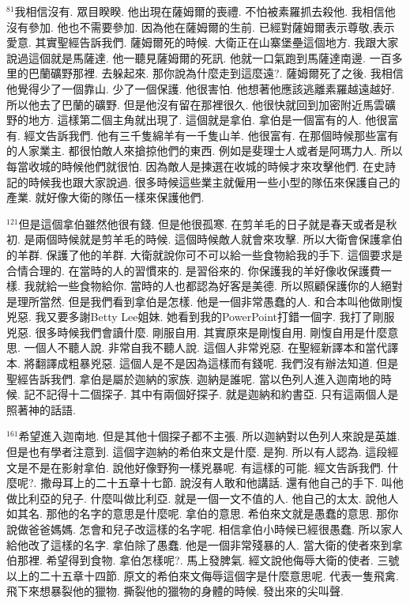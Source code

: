 \documentclass{book}
\begin{document}
$^{81}$我相信沒有.
眾目睽睽.
他出現在薩姆爾的喪禮.
不怕被素羅抓去殺他.
我相信他沒有參加.
他也不需要參加.
因為他在薩姆爾的生前.
已經對薩姆爾表示尊敬,表示愛意.
其實聖經告訴我們.
薩姆爾死的時候.
大衛正在山寨堡壘這個地方.
我跟大家說過這個就是馬薩達.
他一聽見薩姆爾的死訊.
他就一口氣跑到馬薩達南邊.
一百多里的巴蘭礦野那裡.
去躲起來.
那你說為什麼走到這麼遠?.
薩姆爾死了之後.
我相信他覺得少了一個靠山.
少了一個保護.
他很害怕.
他想著他應該逃離素羅越遠越好.
所以他去了巴蘭的礦野.
但是他沒有留在那裡很久.
他很快就回到加密附近馬雲礦野的地方.
這樣第二個主角就出現了.
這個就是拿伯.
拿伯是一個富有的人.
他很富有.
經文告訴我們.
他有三千隻綿羊有一千隻山羊.
他很富有.
在那個時候那些富有的人家業主.
都很怕敵人來搶掠他們的東西.
例如是斐理士人或者是阿瑪力人.
所以每當收城的時候他們就很怕.
因為敵人是揀選在收城的時候才來攻擊他們.
在史詩記的時候我也跟大家說過.
很多時候這些業主就僱用一些小型的隊伍來保護自己的產業.
就好像大衛的隊伍一樣來保護他們.

$^{121}$但是這個拿伯雖然他很有錢.
但是他很孤寒.
在剪羊毛的日子就是春天或者是秋初.
是兩個時候就是剪羊毛的時候.
這個時候敵人就會來攻擊.
所以大衛會保護拿伯的羊群.
保護了他的羊群.
大衛就說你可不可以給一些食物給我的手下.
這個要求是合情合理的.
在當時的人的習慣來的.
是習俗來的.
你保護我的羊好像收保護費一樣.
我就給一些食物給你.
當時的人也都認為好客是美德.
所以照顧保護你的人絕對是理所當然.
但是我們看到拿伯是怎樣.
他是一個非常愚蠢的人.
和合本叫他做剛愎兇惡.
我又要多謝Betty Lee姐妹.
她看到我的PowerPoint打錯一個字.
我打了剛服兇惡.
很多時候我們會讀什麼.
剛服自用.
其實原來是剛愎自用.
剛愎自用是什麼意思.
一個人不聽人說.
非常自我不聽人說.
這個人非常兇惡.
在聖經新譯本和當代譯本.
將翻譯成粗暴兇惡.
這個人是不是因為這樣而有錢呢.
我們沒有辦法知道.
但是聖經告訴我們.
拿伯是屬於迦納的家族.
迦納是誰呢.
當以色列人進入迦南地的時候.
記不記得十二個探子.
其中有兩個好探子.
就是迦納和約書亞.
只有這兩個人是照著神的話語.

$^{161}$希望進入迦南地.
但是其他十個探子都不主張.
所以迦納對以色列人來說是英雄.
但是也有學者注意到.
這個字迦納的希伯來文是什麼.
是狗.
所以有人認為.
這段經文是不是在影射拿伯.
說他好像野狗一樣兇暴呢.
有這樣的可能.
經文告訴我們.
什麼呢?.
撒母耳上的二十五章十七節.
說沒有人敢和他講話.
還有他自己的手下.
叫他做比利亞的兒子.
什麼叫做比利亞.
就是一個一文不值的人.
他自己的太太.
說他人如其名.
那他的名字的意思是什麼呢.
拿伯的意思.
希伯來文就是愚蠢的意思.
那你說做爸爸媽媽.
怎會和兒子改這樣的名字呢.
相信拿伯小時候已經很愚蠢.
所以家人給他改了這樣的名字.
拿伯除了愚蠢.
他是一個非常殘暴的人.
當大衛的使者來到拿伯那裡.
希望得到食物.
拿伯怎樣呢?.
馬上發脾氣.
經文說他侮辱大衛的使者.
三號以上的二十五章十四節.
原文的希伯來文侮辱這個字是什麼意思呢.
代表一隻飛禽.
飛下來想暴裂他的獵物.
撕裂他的獵物的身體的時候.
發出來的尖叫聲.
\end{document}

